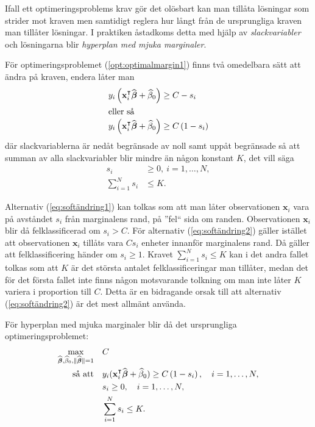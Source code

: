 \documentclass[a4paper, 12pt]{report}
\theoremstyle{definition}
\theoremstyle{remark}
\newcommand{\bfbeta}{{\boldsymbol{\beta}}}
\begin{document}
Ifall ett optimeringsproblems krav gör det olösbart kan man tillåta lösningar som strider mot kraven men samtidigt reglera hur långt från de ursprungliga kraven man tillåter lösningar. I praktiken åstadkoms detta med hjälp av \emph{slackvariabler} och lösningarna blir \emph{hyperplan med mjuka marginaler}.

För optimeringsproblemet (\ref{opt:optimalmargin1}) finns två omedelbara sätt att ändra på kraven, endera låter man
\begin{align}
	y_i\left(\mathbf{x}_i^\intercal\widehat{\bfbeta}+\widehat{\beta}_0\right) &\geq C-s_i\label{eq:softändring1}\\
	\intertext{eller så}
	y_i\left(\mathbf{x}_i^\intercal\widehat{\bfbeta}+\widehat{\beta}_0\right) &\geq C\left(1-s_i\right)\label{eq:softändring2}
\end{align}
där slackvariablerna är nedåt begränsade av noll samt uppåt begränsade så att summan av alla slackvariabler blir mindre än någon konstant $K$, det vill säga \begin{equation*}
\begin{aligned}
s_i&\geq0,~i=1,\dots,N,\\
\sum_{i=1}^{N}s_i&\leq K.
\end{aligned}
\end{equation*}

Alternativ (\ref{eq:softändring1}) kan tolkas som att man låter observationen $\mathbf{x}_i$ vara på avståndet $s_i$ från marginalens rand, på ''fel`` sida om randen. Observationen $\mathbf{x}_i$ blir då felklassificerad om $s_i>C$. För alternativ (\ref{eq:softändring2}) gäller istället att observationen $\mathbf{x}_i$ tillåts vara $Cs_i$ enheter innanför marginalens rand. Då gäller att felklassificering händer om $s_i\geq1$. Kravet $\sum_{i=1}^{N} s_i \leq K$ kan i det andra fallet tolkas som att $K$ är det största antalet felklassificeringar man tillåter, medan det för det första fallet inte finns någon motsvarande tolkning om man inte låter $K$ variera i proportion till $C$. Detta är en bidragande orsak till att alternativ (\ref{eq:softändring2}) är det mest allmänt använda.

För hyperplan med mjuka marginaler blir då det ursprungliga optimeringsproblemet:
\begin{equation}\label{opt:softmargin}
\begin{aligned}
\operatornamewithlimits{max}_{\widehat{\bfbeta},\widehat{\beta}_0,\|\widehat{\bfbeta}\|=1}& & &C\\
\text{så att}& & &y_i(\mathbf{x}_i^\intercal\widehat{\bfbeta}+\widehat{\beta}_0)\geq C\left(1-s_i\right),\quad i=1,\dots,N,\\
& & &s_i\geq0,\quad i=1,\dots,N,\\
& & &\sum_{i=1}^{N}s_i \leq K.
\end{aligned}
\end{equation}
\end{document}
